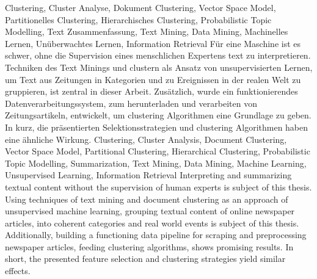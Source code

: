 \HAWAbstractPage
  {
    Clustering, Cluster Analyse, 
    Dokument Clustering, Vector Space Model,
    Partitionelles Clustering,
    Hierarchisches Clustering,
    Probabilistic Topic Modelling, 
    Text Zusammenfassung,
    Text Mining, Data Mining,
    Machinelles Lernen, Unüberwachtes Lernen, 
    Information Retrieval
  }
  { 
    Für eine Maschine ist es schwer, ohne die Supervision eines menschlichen Expertens text zu interpretieren. Techniken des Text Minings und clustern als Ansatz von unsupervisierten Lernen, um Text aus Zeitungen in Kategorien und zu Ereignissen in der realen Welt zu gruppieren, ist zentral in dieser Arbeit. Zusätzlich, wurde ein funktionierendes Datenverarbeitungssystem, zum herunterladen und verarbeiten von Zeitungsartikeln, entwickelt, um clustering Algorithmen eine Grundlage zu geben. In kurz, die präsentierten Selektionsstrategien und clustering Algorithmen haben eine ähnliche Wirkung.
  }
  { 
    Clustering, Cluster Analysis, 
    Document Clustering, Vector Space Model,
    Partitional Clustering,
    Hierarchical Clustering,
    Probabilistic Topic Modelling,
    Summarization,
    Text Mining, Data Mining,
    Machine Learning, Unsupervised Learning, 
    Information Retrieval
  }
  {
    Interpreting and summarizing textual content without the supervision of human experts is subject of this thesis. Using techniques of text mining and document clustering as an approach of unsupervised machine learning, grouping textual content of online newspaper articles, into coherent categories and real world events is subject of this thesis. Additionally, building a functioning data pipeline for scraping and preprocessing newspaper articles, feeding clustering algorithms, shows promising results. In short, the presented feature selection and clustering strategies yield similar effects.
  }



